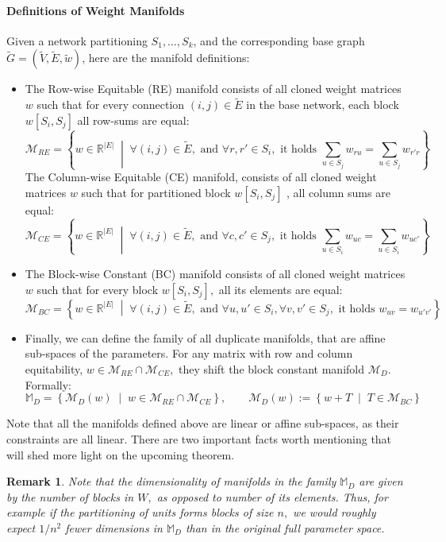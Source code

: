 \documentclass{article}
\newcommand{\R}{\mathbb{R}}
\newcommand{\BaseW}{\widetilde{w}}
\newcommand{\BaseG}{\widetilde{G}}
\newcommand{\BaseV}{\widetilde{V}}
\newcommand{\BaseE}{\widetilde{E}}
\newcommand{\ManifoldD}{\mathcal{M}_{D}}
\newcommand{\ManifoldRE}{\mathcal{M}_{RE}}
\newcommand{\ManifoldCE}{\mathcal{M}_{CE}}
\newcommand{\ManifoldBC}{\mathcal{M}_{BC}}
\newtheorem{remark}{Remark}[section]
\numberwithin{figure}{section}
\begin{document}
\paragraph{Definitions of Weight Manifolds}
Given a network partitioning $S_1,\dots , S_k$, and the corresponding base graph $\BaseG = (\BaseV, \BaseE, \BaseW)$, here are the manifold definitions:
\begin{itemize}
    \item  The Row-wise Equitable (RE) manifold consists of all cloned weight matrices $w$ such that for every connection $(i,j) \in \BaseE$ in the base network, each block $w[S_i, S_j]$ all row-sums are equal:
    $$
\ManifoldRE = \left\{ w\in \R^{|E|} \;\middle|\; \forall (i,j) \in \BaseE, \text{ and } \forall r,r' \in S_i, \text{ it holds } \sum_{u \in S_j}  w_{r u} = \sum_{u \in S_j}  w_{r' r} \right\}
$$
The Column-wise Equitable (CE) manifold, consists of all cloned weight matrices $w$ such that for partitioned block $w[S_i, S_j]$ , all column sums are equal:
$$
\ManifoldCE = \left\{ w\in \R^{|E|} \;\middle|\; \forall (i,j) \in \BaseE, \text{ and } \forall c,c' \in S_j, \text{ it holds } \sum_{u \in S_i}  w_{u c} = \sum_{u \in S_i}  w_{u c'} \right\}
$$
\item The Block-wise Constant (BC) manifold consists of all cloned weight matrices $w$ such that for every block $w[S_i, S_j],$ all its elements are equal:
$$
\ManifoldBC = \left\{ w\in \R^{|E|} \;\middle|\; \forall (i,j) \in \BaseE, \text{ and } \forall u,u' \in S_i, \forall v,v' \in S_j, \text{ it holds }  w_{uv} = w_{u'v'} \right\}
$$
\item Finally, we can define the family of all duplicate manifolds, that are affine sub-spaces of the parameters. For any matrix with row and column equitability, $w\in \ManifoldRE\cap\ManifoldCE,$ they shift the block constant manifold $\ManifoldD.$ Formally:
$$
\mathbb{M}_D = \left\{ \ManifoldD(w) \;\middle|\; w\in \ManifoldRE\cap\ManifoldCE \right\}, \qquad \ManifoldD(w):= \left\{w+T\;\middle|\; T\in \ManifoldBC \right\}
$$
\end{itemize}
Note that all the manifolds defined above are linear or affine sub-spaces, as their constraints are all linear. 
There are two important facts worth mentioning that will shed more light on the upcoming theorem. 
\begin{remark}
Note that the dimensionality of manifolds in the family $\mathbb{M}_D$ are given by the number of blocks in $W,$ as opposed to number of its elements. Thus, for example if the partitioning of units forms blocks of size $n,$ we would roughly expect $1/n^2$ fewer dimensions in $\mathbb{M}_D$ than in the original full parameter space. 
\end{remark}
\end{document}
